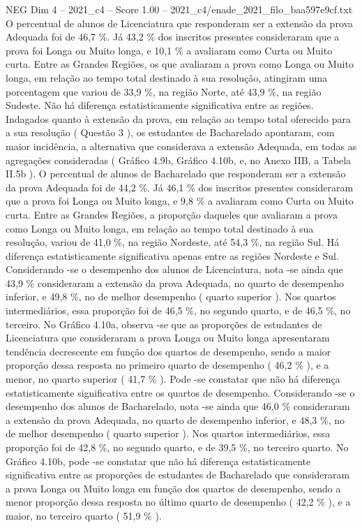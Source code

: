 \begin{textsample}{NEG Dim 4 – 2021\_c4 – Score 1.00 – 2021\_c4/enade\_2021\_filo\_baa597e9cf.txt}
O percentual de alunos de Licenciatura que responderam ser a extensão da prova Adequada foi de 46,7 \%.
Já 43,2 \% dos inscritos presentes consideraram que a prova foi Longa ou Muito longa, e 10,1 \% a avaliaram como Curta ou Muito curta.
Entre as Grandes Regiões, os que avaliaram a prova como Longa ou Muito longa, em relação ao tempo total destinado à sua resolução, atingiram uma porcentagem que variou de 33,9 \%, na região Norte, até 43,9 \%, na região Sudeste.
Não há diferença estatisticamente significativa entre as regiões.
Indagados quanto à extensão da prova, em relação ao tempo total oferecido para a sua resolução ( Questão 3 ), os estudantes de Bacharelado apontaram, com maior incidência, a alternativa que considerava a extensão Adequada, em todas as agregações consideradas ( Gráfico 4.9b, Gráfico 4.10b, e, no Anexo IIB, a Tabela II.5b ).
O percentual de alunos de Bacharelado que responderam ser a extensão da prova Adequada foi de 44,2 \%.
Já 46,1 \% dos inscritos presentes consideraram que a prova foi Longa ou Muito longa, e 9,8 \% a avaliaram como Curta ou Muito curta.
Entre as Grandes Regiões, a proporção daqueles que avaliaram a prova como Longa ou Muito longa, em relação ao tempo total destinado à sua resolução, variou de 41,0 \%, na região Nordeste, até 54,3 \%, na região Sul.
Há diferença estatisticamente significativa apenas entre as regiões Nordeste e Sul.
Considerando -se o desempenho dos alunos de Licenciatura, nota -se ainda que 43,9 \% consideraram a extensão da prova Adequada, no quarto de desempenho inferior, e 49,8 \%, no de melhor desempenho ( quarto superior ).
Nos quartos intermediários, essa proporção foi de 46,5 \%, no segundo quarto, e de 46,5 \%, no terceiro.
No Gráfico 4.10a, observa -se que as proporções de estudantes de Licenciatura que consideraram a prova Longa ou Muito longa apresentaram tendência decrescente em função dos quartos de desempenho, sendo a maior proporção dessa resposta no primeiro quarto de desempenho ( 46,2 \% ), e a menor, no quarto superior ( 41,7 \% ).
Pode -se constatar que não há diferença estatisticamente significativa entre os quartos de desempenho.
Considerando -se o desempenho dos alunos de Bacharelado, nota -se ainda que 46,0 \% consideraram a extensão da prova Adequada, no quarto de desempenho inferior, e 48,3 \%, no de melhor desempenho ( quarto superior ).
Nos quartos intermediários, essa proporção foi de 42,8 \%, no segundo quarto, e de 39,5 \%, no terceiro quarto.
No Gráfico 4.10b, pode -se constatar que não há diferença estatisticamente significativa entre as proporções de estudantes de Bacharelado que consideraram a prova Longa ou Muito longa em função dos quartos de desempenho, sendo a menor proporção dessa resposta no último quarto de desempenho ( 42,2 \% ), e a maior, no terceiro quarto ( 51,9 \% ).

\end{textsample}
